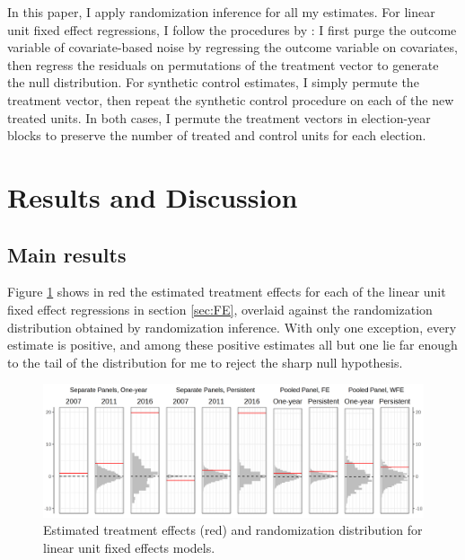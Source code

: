 \documentclass[12pt]{article}\usepackage[]{graphicx}\usepackage[]{color}
\newcommand{\1}{\mathbbm{1}}
\begin{document}

In this paper, I apply randomization inference for all my estimates. For linear unit fixed effect regressions, I follow the procedures by \cite{BowersPanagopoulous2011}: I first purge the outcome variable of covariate-based noise by regressing the outcome variable on covariates, then regress the residuals on permutations of the treatment vector to generate the null distribution. For synthetic control estimates, I simply permute the treatment vector, then repeat the synthetic control procedure on each of the new treated units. In both cases, I permute the treatment vectors in election-year blocks to preserve the number of treated and control units for each election. 

\section{Results and Discussion}
\label{sec:results}

\subsection{Main results}

Figure \ref{fig:FE} shows in red the estimated treatment effects for each of the linear unit fixed effect regressions in section \ref{sec:FE}, overlaid against the randomization distribution obtained by randomization inference. With only one exception, every estimate is positive, and among these positive estimates all but one  lie far enough to the tail of the distribution for me to reject the sharp null hypothesis. 

\begin{figure}[!htbp]
	\centering
	\includegraphics[width=\textwidth]{figure/SYP_FE.png}
	\captionsetup{singlelinecheck=off}
	\caption[Estimated treatment effects for linear unit fixed effects models]{Estimated treatment effects (red) and randomization distribution for linear unit fixed effects models.}
		\label{fig:FE}
	\end{figure}
\end{document}
